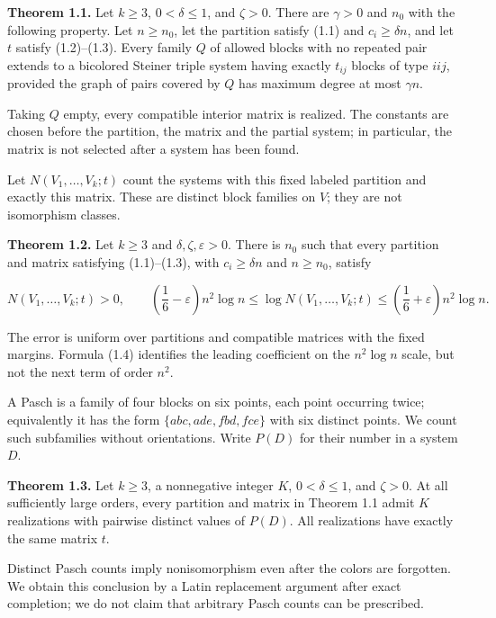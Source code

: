 \documentclass[english,11pt,a4paper]{article}
\begin{document}
\textbf{Theorem 1.1.} Let \(k\ge3\), \(0<\delta\le1\), and \(\zeta>0\). There are \(\gamma>0\) and \(n_0\) with the following property. Let \(n\ge n_0\), let the partition satisfy (1.1) and \(c_i\ge\delta n\), and let \(t\) satisfy (1.2)--(1.3). Every family \(Q\) of allowed blocks with no repeated pair extends to a bicolored Steiner triple system having exactly \(t_{ij}\) blocks of type \(iij\), provided the graph of pairs covered by \(Q\) has maximum degree at most \(\gamma n\).

Taking \(Q\) empty, every compatible interior matrix is realized. The constants are chosen before the partition, the matrix and the partial system; in particular, the matrix is not selected after a system has been found.

Let \(N(V_1,\ldots,V_k;t)\) count the systems with this fixed labeled partition and exactly this matrix. These are distinct block families on \(V\); they are not isomorphism classes.

\textbf{Theorem 1.2.} Let \(k\ge3\) and \(\delta,\zeta,\varepsilon>0\). There is \(n_0\) such that every partition and matrix satisfying (1.1)--(1.3), with \(c_i\ge\delta n\) and \(n\ge n_0\), satisfy

\[N(V_1,\ldots,V_k;t)>0,
\qquad
\left(\frac16-\varepsilon\right)n^2\log n
\le\log N(V_1,\ldots,V_k;t)
\le\left(\frac16+\varepsilon\right)n^2\log n.
\tag{1.4}\]

The error is uniform over partitions and compatible matrices with the fixed margins. Formula (1.4) identifies the leading coefficient on the \(n^2\log n\) scale, but not the next term of order \(n^2\).

A Pasch is a family of four blocks on six points, each point occurring twice; equivalently it has the form \(\{abc,ade,fbd,fce\}\) with six distinct points. We count such subfamilies without orientations. Write \(P(D)\) for their number in a system \(D\).

\textbf{Theorem 1.3.} Let \(k\ge3\), a nonnegative integer \(K\), \(0<\delta\le1\), and \(\zeta>0\). At all sufficiently large orders, every partition and matrix in Theorem 1.1 admit \(K\) realizations with pairwise distinct values of \(P(D)\). All realizations have exactly the same matrix \(t\).

Distinct Pasch counts imply nonisomorphism even after the colors are forgotten. We obtain this conclusion by a Latin replacement argument after exact completion; we do not claim that arbitrary Pasch counts can be prescribed.
\end{document}
